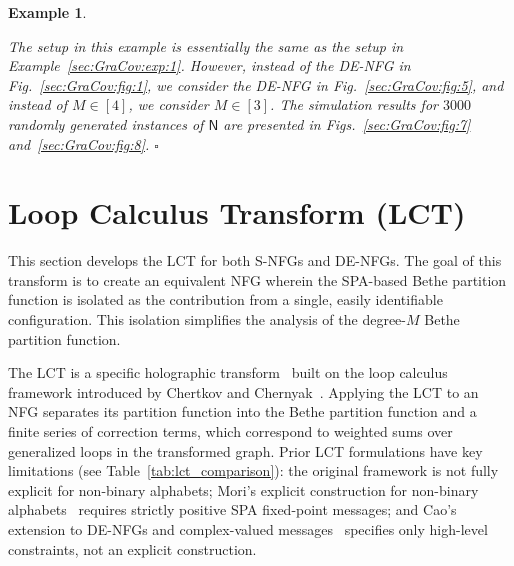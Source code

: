 \documentclass[journal]{IEEEtran}
\newcommand{\add}[1]{{\color{black}#1}}
\newtheorem{example}[theorem]{Example}
\newcommand{\manualendsymbol}[1]{%
  \leavevmode\unskip\penalty9999\hbox{}\nobreak\hfill
  \quad\hbox{#1}}
\newcommand{\eexample}{\manualendsymbol{\ensuremath{\square}}}
\newcommand{\graphN}{ \mathsf{N} }
\begin{document}
\begin{example}
  \label{sec:GraCov:exp:2}

  The setup in this example is essentially the same as the setup in Example~\ref{sec:GraCov:exp:1}. However,
  instead of the DE-NFG in Fig.~\ref{sec:GraCov:fig:1}, we consider the DE-NFG in
  Fig.~\ref{sec:GraCov:fig:5}, and instead of $M\in [4]$, we consider $M \in [3]$. The simulation results for $3000$ randomly
  generated instances of $\graphN$ are presented in
  Figs.~\ref{sec:GraCov:fig:7} and~\ref{sec:GraCov:fig:8}.
  \eexample
\end{example}

\section{Loop Calculus Transform (LCT)}\label{sec:LCT}

This section develops the LCT for both S-NFGs and DE-NFGs. The goal of this transform is to create an equivalent NFG wherein the SPA-based Bethe partition function is isolated as the contribution from a single, easily identifiable configuration. This isolation simplifies the analysis of the degree-$M$ Bethe partition function.

The LCT is a specific holographic transform~\cite{AlBashabsheh2011} \add{built on} the loop calculus framework introduced by Chertkov and Chernyak~\cite{Chertkov2006, Chernyak2007}. Applying the LCT to an NFG separates its partition function into the Bethe partition function and a finite series of correction terms, which correspond to weighted sums over generalized loops in the transformed graph. \add{Prior LCT formulations have key limitations (see Table~\ref{tab:lct_comparison}): the original framework is not fully explicit for non-binary alphabets; Mori's explicit construction for non-binary alphabets~\cite{Mori2015} requires strictly positive SPA fixed-point messages; and Cao's extension to DE-NFGs and complex-valued messages~\cite{Cao2021} specifies only high-level constraints, not an explicit construction.}
\end{document}

